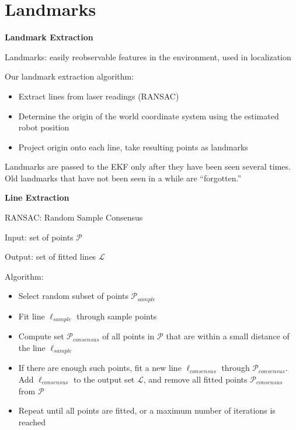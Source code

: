 \documentclass[xcolor=dvipsnames]{beamer}
\begin{document}
  \section{Landmarks}
  \begin{frame}{\bf Landmark Extraction}

    Landmarks: easily reobservable features in the environment, used in
    localization
    \vspace{1cm}

    Our landmark extraction algorithm:
    \begin{itemize}
    \item Extract lines from laser readings (RANSAC)
    \item Determine the origin of the world coordinate system using the
          estimated robot position
    \item Project origin onto each line, take resulting points as landmarks
    \end{itemize}
    \vspace{1cm}

    Landmarks are passed to the EKF only after they have been seen several
    times. Old landmarks that have not been seen in a while are ``forgotten.''
  \end{frame}

  \begin{frame}{\bf Line Extraction}

    RANSAC: Random Sample Consensus
    \vspace{0.5cm}

    Input: set of points $\mathcal{P}$

    Output: set of fitted lines $\mathcal{L}$

    Algorithm:
    \begin{itemize}
    \item Select random subset of points $\mathcal{P}_{sample}$
    \item Fit line $\ell_{sample}$ through sample points
    \item Compute set $\mathcal{P}_{consensus}$ of all points in $\mathcal{P}$
          that are within a small distance of the line $\ell_{sample}$
    \item If there are enough such points, fit a new line
          $\ell_{consensus}$ through $\mathcal{P}_{consensus}$.
          Add $\ell_{consensus}$ to the output set $\mathcal{L}$, and
          remove all fitted points $\mathcal{P}_{consensus}$ from $\mathcal{P}$
    \item Repeat until all points are fitted, or a maximum number of iterations
          is reached
    \end{itemize}
  \end{frame}
\end{document}
